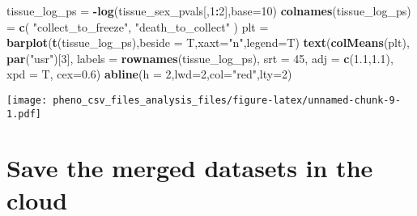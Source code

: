 \documentclass[]{article}
\newenvironment{Shaded}{\begin{snugshade}}{\end{snugshade}}
\newcommand{\KeywordTok}[1]{\textcolor[rgb]{0.13,0.29,0.53}{\textbf{#1}}}
\newcommand{\DataTypeTok}[1]{\textcolor[rgb]{0.13,0.29,0.53}{#1}}
\newcommand{\DecValTok}[1]{\textcolor[rgb]{0.00,0.00,0.81}{#1}}
\newcommand{\FloatTok}[1]{\textcolor[rgb]{0.00,0.00,0.81}{#1}}
\newcommand{\StringTok}[1]{\textcolor[rgb]{0.31,0.60,0.02}{#1}}
\newcommand{\CommentTok}[1]{\textcolor[rgb]{0.56,0.35,0.01}{\textit{#1}}}
\newcommand{\OperatorTok}[1]{\textcolor[rgb]{0.81,0.36,0.00}{\textbf{#1}}}
\newcommand{\NormalTok}[1]{#1}
\begin{document}
\begin{Shaded}
\begin{Highlighting}[]
\NormalTok{tissue_log_ps =}\StringTok{ }\OperatorTok{-}\KeywordTok{log}\NormalTok{(tissue_sex_pvals[,}\DecValTok{1}\OperatorTok{:}\DecValTok{2}\NormalTok{],}\DataTypeTok{base=}\DecValTok{10}\NormalTok{)}
\KeywordTok{colnames}\NormalTok{(tissue_log_ps) =}\StringTok{ }\KeywordTok{c}\NormalTok{(}
  \StringTok{"collect_to_freeze"}\NormalTok{,}
  \StringTok{"death_to_collect"}
\NormalTok{)}
\NormalTok{plt =}\StringTok{ }\KeywordTok{barplot}\NormalTok{(}\KeywordTok{t}\NormalTok{(tissue_log_ps),}\DataTypeTok{beside =}\NormalTok{ T,}\DataTypeTok{xaxt=}\StringTok{"n"}\NormalTok{,}\DataTypeTok{legend=}\NormalTok{T)}
\KeywordTok{text}\NormalTok{(}\KeywordTok{colMeans}\NormalTok{(plt), }\KeywordTok{par}\NormalTok{(}\StringTok{"usr"}\NormalTok{)[}\DecValTok{3}\NormalTok{], }\DataTypeTok{labels =} \KeywordTok{rownames}\NormalTok{(tissue_log_ps), }
     \DataTypeTok{srt =} \DecValTok{45}\NormalTok{, }\DataTypeTok{adj =} \KeywordTok{c}\NormalTok{(}\FloatTok{1.1}\NormalTok{,}\FloatTok{1.1}\NormalTok{), }\DataTypeTok{xpd =}\NormalTok{ T, }\DataTypeTok{cex=}\FloatTok{0.6}\NormalTok{)}
\KeywordTok{abline}\NormalTok{(}\DataTypeTok{h =} \DecValTok{2}\NormalTok{,}\DataTypeTok{lwd=}\DecValTok{2}\NormalTok{,}\DataTypeTok{col=}\StringTok{"red"}\NormalTok{,}\DataTypeTok{lty=}\DecValTok{2}\NormalTok{)}
\end{Highlighting}
\end{Shaded}

\texttt{[image: pheno\_csv\_files\_analysis\_files/figure-latex/unnamed-chunk-9-1.pdf]}

\begin{Shaded}
\end{Shaded}

\section{Save the merged datasets in the
cloud}\label{save-the-merged-datasets-in-the-cloud}
\end{document}

